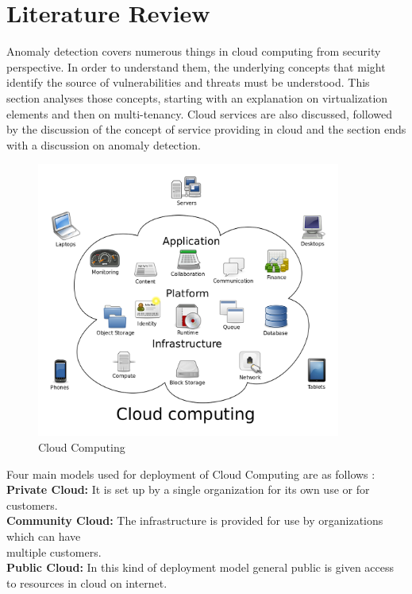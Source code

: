 
\chapter{Literature Review}
\label{chap:chapter2}
Anomaly detection covers numerous things in cloud computing from security perspective. In order to understand them, the underlying concepts that might identify the source of vulnerabilities and threats must be understood. This section analyses those concepts, starting with an explanation on virtualization elements and then on multi-tenancy. Cloud services are also discussed, followed by the discussion of the concept of service providing in cloud  and the section ends with a discussion on anomaly detection.
\begin{figure}
    \centering
    \includegraphics[width=10cm]{texfiles/images/Cloud_computing.png}
    \caption{Cloud Computing\cite{cloud33}}
    \label{fig:my_label}
\end{figure}
\newline
Four main models used for deployment of Cloud Computing are as follows \cite{mell62011}:\\
\textbf{Private Cloud:}  It is set up by a single organization for its own use or for customers.\\
\textbf{Community Cloud:} The infrastructure is provided for use by organizations which can have \\multiple customers.\\
\textbf{Public Cloud:} In this kind of deployment model general public is given access to resources in cloud on internet.\\
